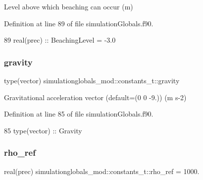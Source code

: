 Level above which beaching can occur (m) 



Definition at line 89 of file simulation\+Globals.\+f90.


\begin{DoxyCode}
89         \textcolor{keywordtype}{real(prec)}   :: BeachingLevel = -3.0
\end{DoxyCode}
\mbox{\label{structsimulationglobals__mod_1_1constants__t_abe210fea4268af42f1cb950a1e3b3cfd}} 
\subsubsection{\texorpdfstring{gravity}{gravity}}
{\footnotesize\ttfamily type(vector) simulationglobals\+\_\+mod\+::constants\+\_\+t\+::gravity\hspace{0.3cm}{\ttfamily [private]}}



Gravitational acceleration vector (default=(0 0 -\/9.)) (m s-\/2) 



Definition at line 85 of file simulation\+Globals.\+f90.


\begin{DoxyCode}
85         \textcolor{keywordtype}{type}(vector) :: Gravity
\end{DoxyCode}
\mbox{\label{structsimulationglobals__mod_1_1constants__t_ac466093200262cde2551525b04809d3a}} 
\subsubsection{\texorpdfstring{rho\+\_\+ref}{rho\_ref}}
{\footnotesize\ttfamily real(prec) simulationglobals\+\_\+mod\+::constants\+\_\+t\+::rho\+\_\+ref = 1000.\hspace{0.3cm}{\ttfamily [private]}}



